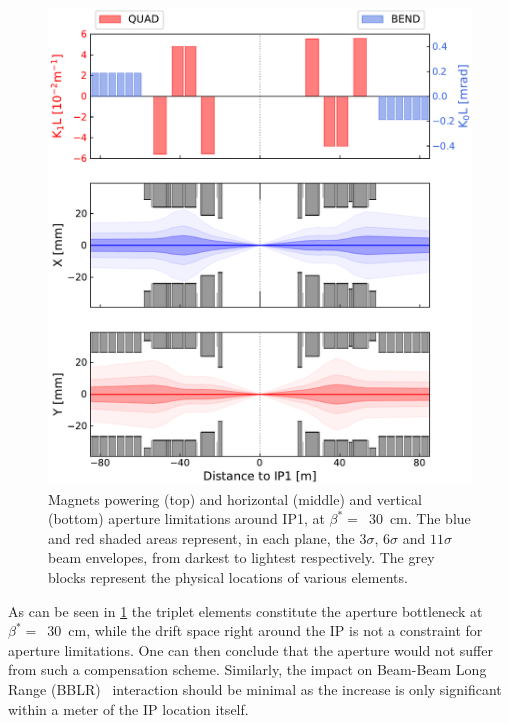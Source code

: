 \begin{figure}[!htb]
    \centering
    \includegraphics*[width=\textwidth]{Figures/IR_Coupling_Correction/lhc_ir1_30cm_apertures.pdf}
    \caption{Magnets powering (top) and horizontal (middle) and vertical (bottom) aperture limitations around IP\num{1}, at \(\beta^{\ast} =\)~\qty{30}{\centi\meter}. The \textcolor{mplb}{blue} and \textcolor{mplr}{red} shaded areas represent, in each plane, the \(3 \sigma\), \(6 \sigma\) and \(11 \sigma\) beam envelopes, from darkest to lightest respectively. The grey blocks represent the physical locations of various elements.}
    \label{figure:lhc_ir1_30cm_apertures}
\end{figure}

As can be seen in \cref{figure:lhc_ir1_30cm_apertures} the triplet elements constitute the aperture bottleneck at \(\beta^{\ast} =\)~\qty{30}{\centi\meter}, while the drift space right around the IP is not a constraint for aperture limitations.
One can then conclude that the aperture would not suffer from such a compensation scheme.
Similarly, the impact on Beam-Beam Long Range (BBLR)~\cite{PHD:Poyet} interaction should be minimal as the increase is only significant within a meter of the \gls{IP} location itself.

